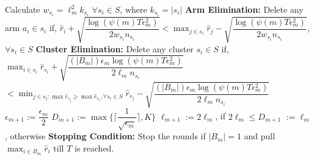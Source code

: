 \begin{algorithmic}[1]
\State \hspace*{2em} Calculate $w_{s_{i}}=\ell_{m}^{2}k_{s_{i}}$ $\forall s_{i}\in S$, where $k_{s_{i}}=|s_{i}|$
\State \hspace*{2em} \textbf{Arm Elimination:}
\State \hspace*{2em} Delete any arm $a_{i}\in s_{i}$ if,
\newline\hspace*{2em}$\hat{r}_{i} + \sqrt{\dfrac{\log{(\psi(m)T\epsilon_{m}^{2})}}{2w_{s_{i}}n_{s_{i}}}}  < \max_{j\in s_{i}}\hat{r}_{j} -\sqrt{\dfrac{\log{(\psi(m)T\epsilon_{m}^{2})}}{2w_{s_{i}}n_{s_{i}}}} $, $\forall s_{i}\in S$ 
\State \hspace*{2em} \textbf{Cluster Elimination:}
\State \hspace*{2em} Delete any cluster $s_{i}\in S$ if, $\max_{i\in s_{i}}\hat{r}_{s_{i}} + \sqrt{\dfrac{(|B_{m}|)\epsilon_{m}\log{(\psi(m)T\epsilon_{m}^{2})}}{2\ell_{m} n_{s_{i}}}}  $\newline\hspace*{4em}$< \min_{j\in s_{j}:\max{\hat{r}_{s_{j}}}\geq \max\hat{r}_{s_{i}},\forall s_{i}\in S}\hat{r}_{s_{j}} - \sqrt{\dfrac{(|B_{m}|)\epsilon_{m}\log{(\psi(m)T\epsilon_{m}^{2})}}{2\ell_{m} n_{s_{i}}}}$
\State \hspace*{2em} $\epsilon_{m+1}:=\dfrac{\epsilon_{m}}{2}$
\State \hspace*{2em} $D_{m+1}:=\max{\bigg\lbrace\bigg\lceil\dfrac{1}{\sqrt{\epsilon_{m}}}\bigg\rceil,K\bigg\rbrace}$
\State \hspace*{2em} $\ell_{m+1}:=2\ell_{m}$, if $2\ell_{m}\leq D_{m+1}$
\newline\hspace*{4.9em}$:=\ell_{m}$ , otherwise
\State \hspace*{2em} \textbf{Stopping Condition:} 
\State \hspace*{2em} Stop the rounds if $|B_{m}|=1$ and pull $\max_{i\in B_{m}}\hat{r}_{i}$ till $T$ is reached.
\end{algorithmic}
\noindent\makebox[\linewidth]{\rule{\textwidth}{0.4pt}}\\[-0.6cm]

